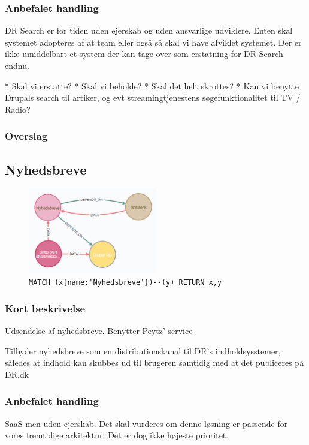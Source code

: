 \documentclass{article}
\begin{document}
\subsubsection*{Anbefalet handling}
DR Search er for tiden uden ejerskab og uden ansvarlige udviklere. Enten skal systemet adopteres af at team eller også så skal vi have afviklet systemet. Der er ikke umiddelbart et system der kan tage over som erstatning for DR Search endnu. 

* Skal vi erstatte?
* Skal vi beholde?
* Skal det helt skrottes?
* Kan vi benytte Drupals search til artiker, og evt streamingtjenestens søgefunktionalitet til TV / Radio?
\subsubsection*{Overslag}


\subsection{Nyhedsbreve}
\begin{figure}[H]
\includegraphics[width=160pt]{Nyhedsbreve.PNG}
\cprotect\caption{\verb|MATCH (x{name:'Nyhedsbreve'})--(y) RETURN x,y|}
\end{figure}
\subsubsection*{Kort beskrivelse}
Udsendelse af nyhedsbreve. Benytter Peytz' service	

Tilbyder nyhedsbreve som en distributionskanal til DR's indholdsysstemer, således at indhold kan skubbes ud til brugeren samtidig med at det publiceres på DR.dk
\subsubsection*{Anbefalet handling}
SaaS men uden ejerskab. 
Det skal vurderes om denne løsning er passende for vores fremtidige arkitektur. Det er dog ikke højeste prioritet.
\end{document}
